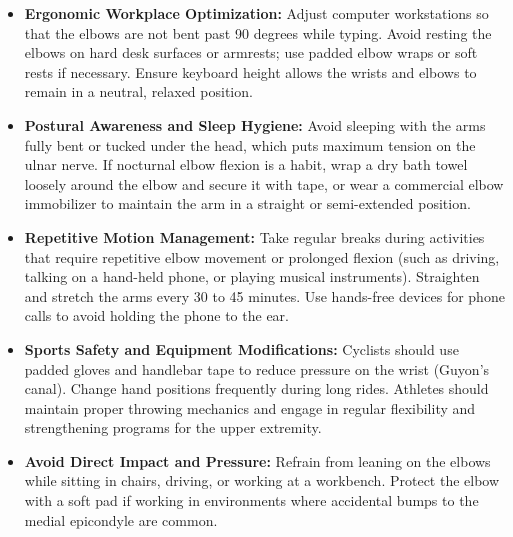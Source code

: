 \begin{itemize}
\item \textbf{Ergonomic Workplace Optimization:} Adjust computer workstations so that the elbows are not bent past 90 degrees while typing. Avoid resting the elbows on hard desk surfaces or armrests; use padded elbow wraps or soft rests if necessary. Ensure keyboard height allows the wrists and elbows to remain in a neutral, relaxed position.
\item \textbf{Postural Awareness and Sleep Hygiene:} Avoid sleeping with the arms fully bent or tucked under the head, which puts maximum tension on the ulnar nerve. If nocturnal elbow flexion is a habit, wrap a dry bath towel loosely around the elbow and secure it with tape, or wear a commercial elbow immobilizer to maintain the arm in a straight or semi-extended position.
\item \textbf{Repetitive Motion Management:} Take regular breaks during activities that require repetitive elbow movement or prolonged flexion (such as driving, talking on a hand-held phone, or playing musical instruments). Straighten and stretch the arms every 30 to 45 minutes. Use hands-free devices for phone calls to avoid holding the phone to the ear.
\item \textbf{Sports Safety and Equipment Modifications:} Cyclists should use padded gloves and handlebar tape to reduce pressure on the wrist (Guyon's canal). Change hand positions frequently during long rides. Athletes should maintain proper throwing mechanics and engage in regular flexibility and strengthening programs for the upper extremity.
\item \textbf{Avoid Direct Impact and Pressure:} Refrain from leaning on the elbows while sitting in chairs, driving, or working at a workbench. Protect the elbow with a soft pad if working in environments where accidental bumps to the medial epicondyle are common.
\end{itemize}

